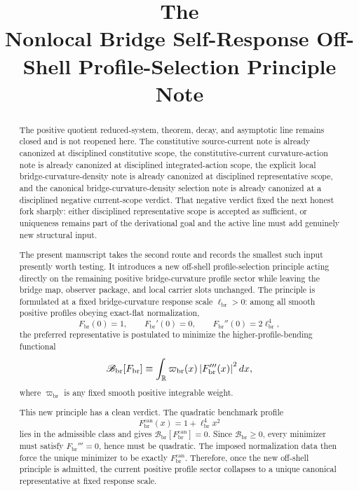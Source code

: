 \documentclass[11pt]{article}
\title{\textbf{The \TheoryName{}}\\[0.4em]
\large Nonlocal Bridge Self-Response Off-Shell Profile-Selection Principle Note}
\author{}
\date{}
\newcommand{\CurvScale}{\ell_{\mathrm{br}}}
\newcommand{\CurvProfile}{F_{\mathrm{br}}}
\newcommand{\CurvProfileCan}{F_{\mathrm{br}}^{\mathrm{can}}}
\newcommand{\ProfWeight}{\varpi_{\mathrm{br}}}
\newcommand{\ProfBend}{\mathscr B_{\mathrm{br}}}
\begin{document}
\maketitle

\begin{abstract}
The positive quotient reduced-system, theorem, decay, and asymptotic line remains closed and is not reopened here. The constitutive source-current note is already canonized at disciplined constitutive scope, the constitutive-current curvature-action note is already canonized at disciplined integrated-action scope, the explicit local bridge-curvature-density note is already canonized at disciplined representative scope, and the canonical bridge-curvature-density selection note is already canonized at a disciplined negative current-scope verdict. That negative verdict fixed the next honest fork sharply: either disciplined representative scope is accepted as sufficient, or uniqueness remains part of the derivational goal and the active line must add genuinely new structural input.

The present manuscript takes the second route and records the smallest such input presently worth testing. It introduces a new off-shell profile-selection principle acting directly on the remaining positive bridge-curvature profile sector while leaving the bridge map, observer package, and local carrier slots unchanged. The principle is formulated at a fixed bridge-curvature response scale \(\CurvScale>0\): among all smooth positive profiles obeying exact-flat normalization,
\[
\CurvProfile(0)=1,
\qquad
\CurvProfile'(0)=0,
\qquad
\CurvProfile''(0)=2\CurvScale^4,
\]
the preferred representative is postulated to minimize the higher-profile-bending functional
\[
\ProfBend[\CurvProfile]
\equiv
\int_{\mathbb R}\ProfWeight(x)\,\abs{\CurvProfile'''(x)}^2\,dx,
\]
where \(\ProfWeight\) is any fixed smooth positive integrable weight.

This new principle has a clean verdict. The quadratic benchmark profile
\[
\CurvProfileCan(x)=1+\CurvScale^4x^2
\]
lies in the admissible class and gives \(\ProfBend[\CurvProfileCan]=0\). Since \(\ProfBend\geq0\), every minimizer must satisfy \(\CurvProfile'''=0\), hence must be quadratic. The imposed normalization data then force the unique minimizer to be exactly \(\CurvProfileCan\). Therefore, once the new off-shell principle is admitted, the current positive profile sector collapses to a unique canonical representative at fixed response scale.


\end{abstract}
\end{document}
